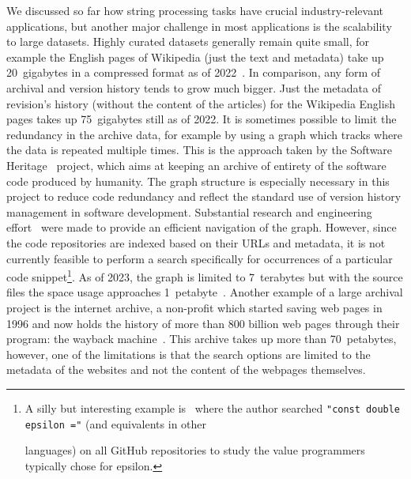 We discussed so far how string processing tasks have crucial industry-relevant applications, but another major challenge in most applications is the scalability to large datasets.
Highly curated datasets generally remain quite small, for example the English pages of Wikipedia (just the text and metadata) take up 20~gigabytes in a compressed format as of 2022~\cite{wikimedia}. In comparison, any form of archival and version history tends to grow much bigger. Just the metadata of revision's history (without the content of the articles) for the Wikipedia English pages takes up 75~gigabytes still as of 2022.
It is sometimes possible to limit the redundancy in the archive data, for example by using a graph which tracks where the data is repeated multiple times. This is the approach taken by the Software Heritage~\cite{swh-site} project, which aims at keeping an archive of entirety of the software code produced by humanity. The graph structure is especially necessary in this project to reduce code redundancy and reflect the standard use of version history management in software development.
Substantial research and engineering effort~\cite{DBLP:phd/hal/Pietri21} were made to provide an efficient navigation of the graph. 
However, since the code repositories are indexed based on their URLs and metadata, it is not currently feasible to perform a search specifically for occurrences of a particular code snippet\footnote{\setlength\parindent{10pt} A silly but interesting example is~\cite{vii2014if} where the author searched \texttt{"const double epsilon ="} (and equivalents in other \par languages) on all GitHub repositories to study the value programmers typically chose for epsilon.}.
As of 2023, the graph is limited to 7~terabytes but with the source files the space usage approaches 1~petabyte~\cite{swh-polytechnique}.
Another example of a large archival project is the internet archive, a non-profit which started saving web pages in 1996 and now holds the history of more than 800 billion web pages through their program: the wayback machine~\cite{web-archive}. This archive takes up more than 70~petabytes, however, one of the limitations is that the search options are limited to the metadata of the websites and not the content of the webpages themselves.


